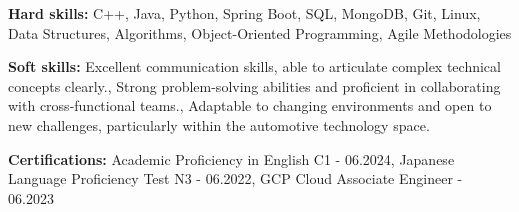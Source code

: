 \documentclass[10pt, letterpaper]{article}
\begin{document}
\noindent\textbf{Hard skills:}
C++, Java, Python, Spring Boot, SQL, MongoDB, Git, Linux, Data Structures, Algorithms, Object-Oriented Programming, Agile Methodologies
\vspace{5pt}

\noindent\textbf{Soft skills:}
Excellent communication skills, able to articulate complex technical concepts clearly., Strong problem-solving abilities and proficient in collaborating with cross-functional teams., Adaptable to changing environments and open to new challenges, particularly within the automotive technology space.
\vspace{5pt}

\noindent\textbf{Certifications:}
Academic Proficiency in English C1 - 06.2024, Japanese Language Proficiency Test N3 - 06.2022, GCP Cloud Associate Engineer - 06.2023
\end{document}
